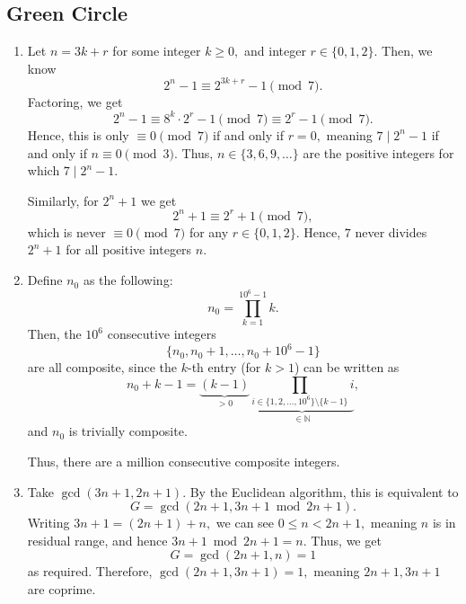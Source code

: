 \documentclass[12pt]{article}
\begin{document}
\subsection{Green Circle}
\begin{enumerate}
  \item[1] Let $n = 3k + r$ for some integer $k \geq 0,$ and integer
    $r \in \{0, 1, 2\}.$ Then, we know
    $$
    2^{n} - 1 \equiv 2^{3k + r} -1  \pmod 7.
    $$
    Factoring, we get
    $$
    2^{n} -1 \equiv 8^{k} \cdot 2^{r} -1 \pmod 7 \equiv 2^{r} - 1 \pmod 7.
    $$
    Hence, this is only $\equiv 0 \pmod 7$ if and only if $r = 0,$
    meaning $7 \mid 2^{n} - 1$ if and only if $n \equiv 0 \pmod 3.$
    Thus, $n \in \{3, 6, 9, \ldots\}$ are the positive integers for
    which $7 \mid 2^{n} - 1.$

    Similarly, for $2^n + 1$ we get
    $$
    2^{n} + 1  \equiv 2^{r} + 1 \pmod 7,
    $$
    which is never $\equiv 0 \pmod 7$ for any $r \in \{0, 1, 2\}.$
    Hence, $7$ never divides $2^{n} + 1$ for all positive integers $n.$

  \item[3] Define $n_0$ as the following:
    $$
    n_0 = \prod_{k = 1}^{10^{6} - 1} k.
    $$
    Then, the $10^6$ consecutive integers
    $$
    \{n_0, n_0 + 1, \ldots, n_0 + 10^{6} - 1\}
    $$
    are all composite, since the $k$-th entry (for $k > 1$) can be written as
    $$
    n_0 + k - 1 = \underbrace{(k-1)}_{> 0} \underbrace{\prod_{i \in
    \{1, 2, \ldots, 10^6\} \setminus\{k - 1\}} i}_{\in \mathbb N},
    $$
    and $n_0$ is trivially composite.

    Thus, there are a million consecutive composite integers.

  \item[4] Take $\gcd(3n + 1, 2n + 1).$ By the Euclidean algorithm,
    this is equivalent to $$
    G = \gcd(2n + 1, 3n + 1 \bmod 2n+ 1).
    $$
    Writing $3n + 1 = (2n + 1) + n,$ we can see $0 \leq n < 2n + 1,$
    meaning $n$ is in residual range, and hence $3n + 1 \bmod 2n + 1
    = n.$ Thus, we get
    $$
    G = \gcd(2n + 1, n) = 1
    $$
    as required. Therefore, $\gcd(2n + 1, 3n + 1) = 1,$ meaning $2n +
    1, 3n + 1$ are coprime.
\end{enumerate}
\end{document}

